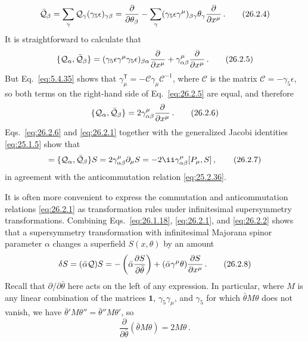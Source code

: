 \begin{equation}
  \bar{\mathcal{Q}}_\beta
  =\sum_\gamma\mathcal{Q}_\gamma(\gamma_5\epsilon)_{\gamma\beta}
  =\frac{\partial}{\partial\theta_\beta}
  -\sum_\gamma(\gamma_5\epsilon\gamma^\mu)_{\beta\gamma}\theta_\gamma
    \frac{\partial}{\partial x^\mu}\,.
  \tag{26.2.4}\label{eq:26.2.4}
\end{equation}
It is straightforward to calculate that
\begin{equation}
  \{\mathcal{Q}_\alpha,\bar{\mathcal{Q}}_\beta\}
  =(\gamma_5\epsilon\gamma^\mu\gamma_5\epsilon)_{\beta\alpha}
    \frac{\partial}{\partial x^\mu}
  +\gamma^\mu_{\alpha\beta}\frac{\partial}{\partial x^\mu}\,.
  \tag{26.2.5}\label{eq:26.2.5}
\end{equation}
But Eq.~\eqref{eq:5.4.35} shows that
$\gamma_\mu^{\mathsf T}=-\mathcal{C}\gamma_\mu\mathcal{C}^{-1}$, where $\mathcal{C}$ is
the matrix $\mathcal{C}=-\gamma_5\epsilon$, so both terms on the right-hand
side of Eq.~\eqref{eq:26.2.5} are equal, and therefore
\begin{equation}
  \{\mathcal{Q}_\alpha,\bar{\mathcal{Q}}_\beta\}
  =2\gamma^\mu_{\alpha\beta}\frac{\partial}{\partial x^\mu}\,.
  \tag{26.2.6}\label{eq:26.2.6}
\end{equation}
Eqs.~\eqref{eq:26.2.6} and \eqref{eq:26.2.1} together with the generalized
Jacobi identities \eqref{eq:25.1.5} show that
\begin{equation}
  [\{Q_\alpha,\bar Q_\beta\},S]
  =\{\SuperQ_\alpha,\bar{\SuperQ}_\beta\}S
  =2\gamma^\mu_{\alpha\beta}\partial_\mu S
  =-2\ii\gamma^\mu_{\alpha\beta}[P_\mu,S]\,,
  \tag{26.2.7}\label{eq:26.2.7}
\end{equation}
in agreement with the anticommutation relation \eqref{eq:25.2.36}.

It is often more convenient to express the commutation and anticommutation
relations \eqref{eq:26.2.1} as transformation rules under infinitesimal
supersymmetry transformations. Combining Eqs.~\eqref{eq:26.1.18},
\eqref{eq:26.2.1}, and \eqref{eq:26.2.2} shows that a supersymmetry
transformation with infinitesimal Majorana spinor parameter $\alpha$ changes a
superfield $S(x,\theta)$ by an amount
\begin{equation}
  \delta S=(\bar\alpha\mathcal{Q})S
  =-\left(\bar\alpha\frac{\partial S}{\partial\bar\theta}\right)
  +(\bar\alpha\gamma^\mu\theta)\frac{\partial S}{\partial x^\mu}\,.
  \tag{26.2.8}\label{eq:26.2.8}
\end{equation}
Recall that $\partial/\partial\bar\theta$ here acts on the left of any
expression. In particular, where $M$ is any linear combination of the
matrices $\mathbf{1}$, $\gamma_5\gamma_\mu$, and $\gamma_5$ for which
$\bar\theta M\theta$ does not vanish, we have
$\bar\theta'M\theta''=\bar\theta''M\theta'$, so
\begin{equation}
  \frac{\partial}{\partial\bar\theta}
  (\bar\theta M\theta)=2M\theta\,.
  \tag{26.2.9}\label{eq:26.2.9}
\end{equation}

